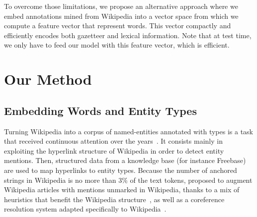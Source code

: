 \documentclass[11pt]{article}
\newcommand{\felipe}[2]{}
\begin{document}
	
	To overcome those limitations, we propose an alternative approach where we embed annotations mined from Wikipedia into a vector space from which we compute a feature vector that represent words. This vector compactly and efficiently encodes both gazetteer and lexical information. Note that at test time, we only have to feed our model with this feature vector, which is efficient. 
	
	
	
	\section{Our Method}		
	\label{sec:method}
	
	
	
	\subsection{Embedding Words and Entity Types}
	
	Turning Wikipedia into a corpus of named-entities annotated with types is a task that received continuous attention over the years~\cite{nothman2008transforming,al2015polyglot,ghaddar2017winer}. It consists mainly in exploiting the hyperlink structure of Wikipedia in order to detect entity mentions. Then, structured data from a knowledge base (for instance Freebase) are used to map hyperlinks to entity types. Because the number of anchored strings in Wikipedia is no more than 3\% of the text tokens\felipe{REFERENCE?}{il me semble qu'il y a avait une reference qui disait un truc comme cela},  proposed to augment Wikipedia articles with  mentions unmarked in Wikipedia, thanks to a mix of heuristics that benefit the Wikipedia structure~\cite{ghaddar2016coreference}, as well as a coreference resolution system adapted specifically to Wikipedia~\cite{GHADDAR16.192}.
	
\end{document}
